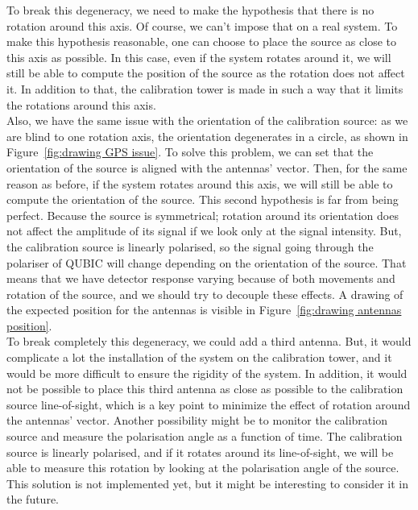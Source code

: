 \documentclass[../../thesis.tex]{subfiles}
\begin{document}
To break this degeneracy, we need to make the hypothesis that there is no rotation around this axis. Of course, we can't impose that on a real system. To make this hypothesis reasonable, one can choose to place the source as close to this axis as possible. In this case, even if the system rotates around it, we will still be able to compute the position of the source as the rotation does not affect it. In addition to that, the calibration tower is made in such a way that it limits the rotations around this axis. \\
Also, we have the same issue with the orientation of the calibration source: as we are blind to one rotation axis, the orientation degenerates in a circle, as shown in Figure~\ref{fig:drawing GPS issue}. To solve this problem, we can set that the orientation of the source is aligned with the antennas' vector. Then, for the same reason as before, if the system rotates around this axis, we will still be able to compute the orientation of the source. This second hypothesis is far from being perfect. Because the source is symmetrical; rotation around its orientation does not affect the amplitude of its signal if we look only at the signal intensity. But, the calibration source is linearly polarised, so the signal going through the polariser of QUBIC will change depending on the orientation of the source. That means that we have detector response varying because of both movements and rotation of the source, and we should try to decouple these effects. A drawing of the expected position for the antennas is visible in Figure~\ref{fig:drawing antennas position}. \\
To break completely this degeneracy, we could add a third antenna. But, it would complicate a lot the installation of the system on the calibration tower, and it would be more difficult to ensure the rigidity of the system. In addition, it would not be possible to place this third antenna as close as possible to the calibration source line-of-sight, which is a key point to minimize the effect of rotation around the antennas' vector. Another possibility might be to monitor the calibration source and measure the polarisation angle as a function of time. The calibration source is linearly polarised, and if it rotates around its line-of-sight, we will be able to measure this rotation by looking at the polarisation angle of the source. This solution is not implemented yet, but it might be interesting to consider it in the future. \\
\end{document}
